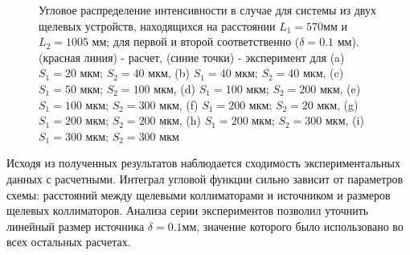 \begin{figure}[H]
  \hfill
  \hfill
  \hfill
  \caption{Угловое распределение интенсивности в случае для системы из двух щелевых устройств, находящихся
  на расстоянии $L_1= 570 $мм и $L_2 = 1005$ мм; для первой и второй соответственно ($\delta = 0.1$ мм).
  (красная линия) - расчет, (синие точки) - эксперимент для (a) $S_1 = 20$ мкм; $S_2 = 40$ мкм,
  (b) $S_1 = 40$ мкм; $S_2 = 40$ мкм, (c) $S_1 = 50$ мкм; $S_2 = 100$ мкм,
  (d) $S_1 = 100$ мкм; $S_2 = 200$ мкм, (e) $S_1 = 100$ мкм; $S_2 = 300$ мкм,
   (f) $S_1 = 200$ мкм; $S_2 = 20$ мкм, (g) $S_1 = 200$ мкм; $S_2 = 200$ мкм,
   (h) $S_1 = 200$ мкм; $S_2 = 300$ мкм, (i) $S_1 = 300$ мкм; $S_2 = 300$ мкм }
  \label{ris:zero_exp}
\end{figure}

Исходя из полученных результатов наблюдается сходимость экспериментальных данных с расчетными.
Интеграл угловой функции сильно зависит от параметров схемы: расстояний между щелевыми коллиматорами и источником и
размеров щелевых коллиматоров. Анализа серии экспериментов позволил уточнить линейный размер источника $\delta = 0.1$мм,
значение которого было использовано во всех остальных расчетах.
